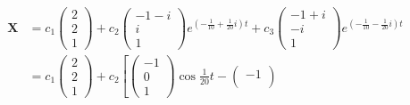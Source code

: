 \documentclass{article}
\begin{document}
\begin{enumerate}
        \begin{align*}
          \mathbf{X} & = c_1 \begin{pmatrix}
                               2 \\
                               2 \\
                               1
                             \end{pmatrix} + c_2 \begin{pmatrix}
                                                   -1 - i \\
                                                   i      \\
                                                   1
                                                 \end{pmatrix} e^{\left( -\frac{1}{10} + \frac{1}{20} i \right) t} + c_3 \begin{pmatrix}
                                                                                                                           -1 + i \\
                                                                                                                           -i     \\
                                                                                                                           1
                                                                                                                         \end{pmatrix} e^{\left( -\frac{1}{10} - \frac{1}{20} i \right) t} \\
                     & = c_1 \begin{pmatrix}
                               2 \\
                               2 \\
                               1
                             \end{pmatrix} + c_2 \left[ \begin{pmatrix}
                                                            -1 \\
                                                            0  \\
                                                            1
                                                          \end{pmatrix} \cos \frac{1}{20} t - \begin{pmatrix}
                                                                                                -1 \\

\end{pmatrix}
\end{align*}
\end{enumerate}
\end{document}
